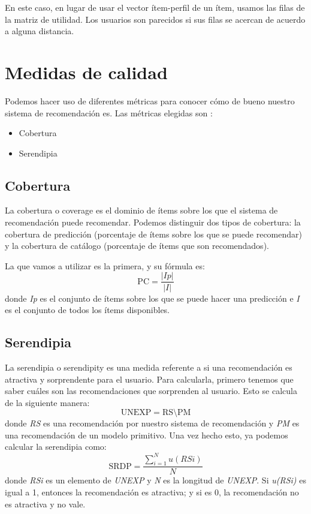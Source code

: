En este caso, en lugar de usar el vector ítem-perfil de un ítem, usamos las filas de la matriz de utilidad. Los usuarios son parecidos si sus filas se acercan de acuerdo a alguna distancia.

\section{Medidas de calidad}\label{medidas-de-calidad}
Podemos hacer uso de diferentes métricas para conocer cómo de bueno nuestro sistema de recomendación es. Las métricas elegidas son \cite{Ge10beyondaccuracy:}:
\begin{itemize}
\tightlist
\item Cobertura
\item Serendipia
\end{itemize}

\subsection{Cobertura}\label{cobertura}
La cobertura o coverage es el dominio de ítems sobre los que el sistema de recomendación puede recomendar. Podemos distinguir dos tipos de cobertura: la cobertura de predicción (porcentaje de ítems sobre los que se puede recomendar) y la cobertura de catálogo (porcentaje de ítems que son recomendados).

La que vamos a utilizar es la primera, y su fórmula es:
\begin{equation}
    \text{PC} = \dfrac{|Ip|}{|I|}
\end{equation}
donde \textit{Ip} es el conjunto de ítems sobre los que se puede hacer una predicción e \textit{I} es el conjunto de todos los ítems disponibles.

\subsection{Serendipia}\label{serendipia}
La serendipia o serendipity es una medida referente a si una recomendación es atractiva y sorprendente para el usuario. Para calcularla, primero tenemos que saber cuáles son las recomendaciones que sorprenden al usuario. Esto se calcula de la siguiente manera:
\begin{equation}
    \text{UNEXP} = \text{RS}\setminus \text{PM}
\end{equation}
donde \textit{RS} es una recomendación por nuestro sistema de recomendación y \textit{PM} es una recomendación de un modelo primitivo. Una vez hecho esto, ya podemos calcular la serendipia como:
\begin{equation}
    \text{SRDP} = \dfrac{\displaystyle\sum_{i=1}^{N}u(RSi)}{N}
\end{equation}
donde \textit{RSi} es un elemento de \textit{UNEXP} y \textit{N} es la longitud de \textit{UNEXP}. Si \textit{u(RSi)} es igual a 1, entonces la recomendación es atractiva; y si es 0, la recomendación no es atractiva y no vale.

